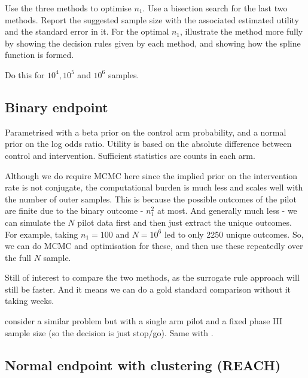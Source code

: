 \documentclass[sagev, Crown]{sagej} %
\begin{document}
Use the three methods to optimise $n_1$. Use a bisection search for the last two methods. Report the suggested sample size with the associated estimated utility and the standard error in it. For the optimal $n_1$, illustrate the method more fully by showing the decision rules given by each method, and showing how the spline function is formed. 

Do this for $10^4, 10^5$ and $10^6$ samples.

\subsection{Binary endpoint}


Parametrised with a beta prior on the control arm probability, and a normal prior on the log odds ratio. Utility is based on the absolute difference between control and intervention. Sufficient statistics are counts in each arm. 

Although we do require MCMC here since the implied prior on the intervention rate is not conjugate, the computational burden is much less and scales well with the number of outer samples. This is because the possible outcomes of the pilot are finite due to the binary outcome - $n_1^2$ at most. And generally much less - we can simulate the $N$ pilot data first and then just extract the unique outcomes. For example, taking $n_1 = 100$ and $N = 10^6$ led to only 2250 unique outcomes. So, we can do MCMC and optimisation for these, and then use these repeatedly over the full $N$ sample.

Still of interest to compare the two methods, as the surrogate rule approach will still be faster. And it means we can do a gold standard comparison without it taking weeks.

\cite{Brunier1994} consider a similar problem but with a single arm pilot and a fixed phase III sample size (so the decision is just stop/go). Same with \cite{Stallard1998}.

\subsection{Normal endpoint with clustering (REACH)}
\end{document}
